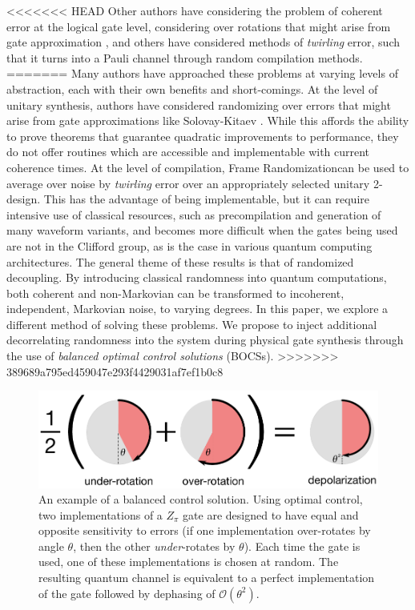 \documentclass[aps,nofootinbib,pra,notitlepage,twocolumn]{revtex4-1}
\newcommand{\order}[1]{\mathcal{O}\left( #1 \right)}
\begin{document}
<<<<<<< HEAD
Other authors have considering the problem of coherent error at the logical gate level, considering over rotations that might arise from gate approximation \cite{Campbell2017, 1612.01011}, and others have considered methods of \textit{twirling} error, such that it turns into a Pauli channel through random compilation methods\cite{Wallman2016, Ware2018}.
=======
Many authors have approached these problems at varying levels of abstraction, each with their own benefits and short-comings. At the level of unitary synthesis, authors have considered randomizing over errors that might arise from gate approximations like Solovay-Kitaev \cite{Campbell2017, 1612.01011}. While this affords the ability to prove theorems that guarantee quadratic improvements to performance, they do not offer routines which are accessible and implementable with current coherence times. At the level of compilation, Frame Randomization\cite{Wallman2016, Ware2018}can be used to average over noise by \textit{twirling} error over an appropriately selected unitary 2-design.\cite{roy2009unitary} This has the advantage of being implementable\cite{Ware2018}, but it can require intensive use of classical resources, such as precompilation and generation of many waveform variants, and becomes more difficult when the gates being used are not in the Clifford group, as is the case in various quantum computing architectures. The general theme of these results is that of randomized decoupling\cite{Viola2005, Viola}. By introducing classical randomness into quantum computations, both coherent and non-Markovian can be transformed to incoherent, independent, Markovian noise, to varying degrees. In this paper, we explore a different method of solving these problems. We propose to inject additional decorrelating randomness into the system during physical gate synthesis through the use of \emph{balanced optimal control solutions} (BOCSs).
>>>>>>> 389689a795ed459047e293f4429031af7ef1b0c8

\begin{figure}
  \centering
  \includegraphics[width=\columnwidth]{simple_example.pdf}
  \caption{An example of a balanced control solution. Using optimal control, two implementations of a $Z_\pi$ gate are designed to have equal and opposite sensitivity to errors (if one implementation over-rotates by angle $\theta$, then the other \emph{under}-rotates by $\theta$). Each time the gate is used, one of these implementations is chosen at random. The resulting quantum channel is equivalent to a perfect implementation of the gate followed by dephasing of $\order{\theta^2}$.}
  \label{fig:simple_example}
\end{figure}
\end{document}
